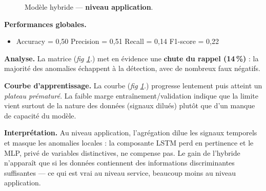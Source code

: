 \documentclass[conference]{IEEEtran}
\begin{document}
\begin{figure}[!t]
  \centering
  \hfill%
  \caption{Modèle hybride — \textbf{niveau application}.}
  \label{fig:hybrid-app}
\end{figure}

\textbf{Performances globales.}
\begin{itemize}
    \item Accuracy = 0{,}50 \quad
          Precision = 0{,}51 \quad
          Recall = 0{,}14 \quad
          F1-score = 0{,}22
\end{itemize}

\textbf{Analyse.}
La matrice (\textit{fig \ref{fig:hybrid-app}.}) met en évidence une \textbf{chute du rappel (14\,\%)} : la majorité des anomalies échappent à la détection, avec de nombreux faux négatifs.

\textbf{Courbe d’apprentissage.}
La courbe (\textit{fig \ref{fig:hybrid-app}.}) progresse lentement puis atteint un \emph{plateau prématuré}. La faible marge entraînement/validation indique que la limite vient surtout de la nature des données (signaux dilués) plutôt que d’un manque de capacité du modèle.

\textbf{Interprétation.}
Au niveau application, l’agrégation dilue les signaux temporels et masque les anomalies locales : la composante LSTM perd en pertinence et le MLP, privé de variables distinctives, ne compense pas. Le gain de l’hybride n’apparaît que si les données contiennent des informations discriminantes suffisantes — ce qui est vrai au niveau service, beaucoup moins au niveau application.
\end{document}
